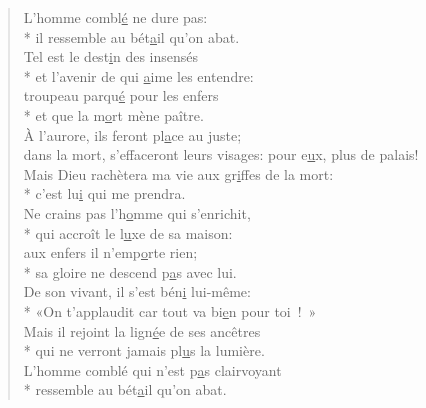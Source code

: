 \begin{verse}
L’homme combl\underline{é} ne dure pas: \\*
il ressemble au bét\underline{a}il qu’on abat. \\

Tel est le dest\underline{i}n des insensés \\*
et l’avenir de qui \underline{a}ime les entendre: \\
troupeau parqu\underline{é} pour les enfers \\*
et que la m\underline{o}rt mène paître. \\

À l’aurore, ils feront pl\underline{a}ce au juste; \\
dans la mort, s’effaceront leurs visages:
pour e\underline{u}x, plus de palais! \\
Mais Dieu rachètera ma vie aux gr\underline{i}ffes de la mort: \\*
c’est lu\underline{i} qui me prendra. \\

Ne crains pas l’h\underline{o}mme qui s’enrichit, \\*
qui accroît le l\underline{u}xe de sa maison: \\
aux enfers il n’emp\underline{o}rte rien; \\*
sa gloire ne descend p\underline{a}s avec lui. \\

De son vivant, il s’est bén\underline{i} lui-même: \\*
«On t’applaudit car tout va bi\underline{e}n pour toi ! » \\
Mais il rejoint la lign\underline{é}e de ses ancêtres \\*
qui ne verront jamais pl\underline{u}s la lumière. \\

L’homme comblé qui n’est p\underline{a}s clairvoyant \\*
ressemble au bét\underline{a}il qu’on abat. \\
\end{verse}


